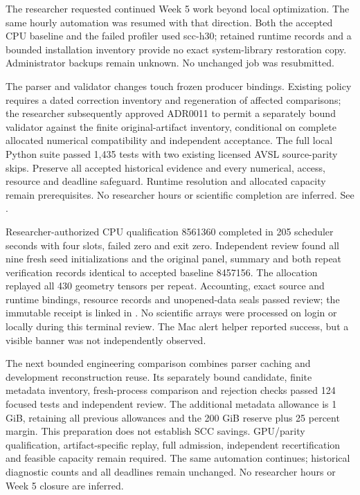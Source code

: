 The researcher requested continued Week 5 work beyond local optimization. The
same hourly automation was resumed with that direction. Both the accepted CPU
baseline and the failed profiler used scc-h30; retained runtime records and a
bounded installation inventory provide no exact system-library restoration copy.
Administrator backups remain unknown. No unchanged job was resubmitted.

The parser and validator changes touch frozen producer bindings. Existing policy
requires a dated correction inventory and regeneration of affected comparisons;
the researcher subsequently approved ADR0011 to permit a separately bound
validator against the finite original-artifact inventory, conditional on complete
allocated numerical compatibility and independent acceptance. The full local
Python suite passed 1,435 tests with two existing licensed AVSL source-parity skips. Preserve all accepted historical
evidence and every numerical, access, resource and deadline safeguard. Runtime
resolution and allocated capacity remain prerequisites. No researcher hours or
scientific completion are inferred. See .


Researcher-authorized CPU qualification 8561360 completed in 205 scheduler
seconds with four slots, failed zero and exit zero. Independent review found all
nine fresh seed initializations and the original panel, summary and both repeat
verification records identical to accepted baseline 8457156. The allocation
replayed all 430 geometry tensors per repeat. Accounting, exact source and runtime
bindings, resource records and unopened-data seals passed review; the immutable
receipt is linked in . No scientific arrays
were processed on login or locally during this terminal review. The Mac alert
helper reported success, but a visible banner was not independently observed.

The next bounded engineering comparison combines parser caching and development
reconstruction reuse. Its separately bound candidate, finite metadata inventory,
fresh-process comparison and rejection checks passed 124 focused tests and
independent review. The additional metadata allowance is 1 GiB, retaining all
previous allowances and the 200 GiB reserve plus 25 percent margin. This preparation
does not establish SCC savings. GPU/parity qualification, artifact-specific replay,
full admission, independent recertification and feasible capacity remain required.
The same automation continues; historical diagnostic counts and all deadlines
remain unchanged. No researcher hours or Week 5 closure are inferred.

